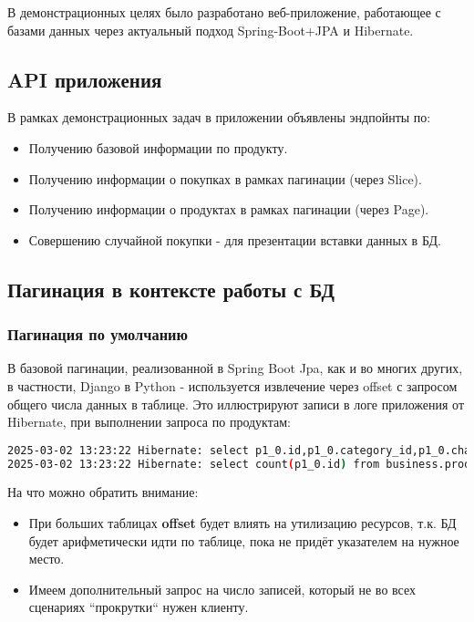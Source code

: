 В демонстрационных целях было разработано веб-приложение, работающее с базами данных через актуальный подход
Spring-Boot+JPA и Hibernate.

\subsection{API приложения}\label{subsec:api-server-app}
В рамках демонстрационных задач в приложении объявлены эндпойнты по:
\begin{itemize}
    \item Получению базовой информации по продукту.
    \item Получению информации о покупках в рамках пагинации (через Slice).
    \item Получению информации о продуктах в рамках пагинации (через Page).
    \item Совершению случайной покупки - для презентации вставки данных в БД.
\end{itemize}

\subsection{Пагинация в контексте работы с БД}\label{subsec:jpapagination}

\subsubsection{Пагинация по умолчанию}\label{subsec:defaultpagination}
В базовой пагинации, реализованной в Spring Boot Jpa, как и во многих других,
в частности, Django в Python - используется извлечение через offset с запросом общего числа данных в таблице.
Это иллюстрируют записи в логе приложения от Hibernate, при выполнении запроса по продуктам:

\begin{lstlisting}[language=bash, frame=single, basicstyle=\normalsize\ttfamily, breaklines=true,label={lst:hiberpagelog}]
2025-03-02 13:23:22 Hibernate: select p1_0.id,p1_0.category_id,p1_0.characteristics,p1_0.description,p1_0.name,p1_0.price from business.product p1_0 offset ? rows fetch first ? rows only
2025-03-02 13:23:22 Hibernate: select count(p1_0.id) from business.product p1_0
\end{lstlisting}

На что можно обратить внимание:
\begin{itemize}
    \item При больших таблицах \textbf{offset} будет влиять на утилизацию ресурсов, т.к. БД будет арифметически
    идти по таблице, пока не придёт указателем на нужное место.
    \item Имеем дополнительный запрос на число записей, который не во всех сценариях ``прокрутки`` нужен клиенту.
\end{itemize}

